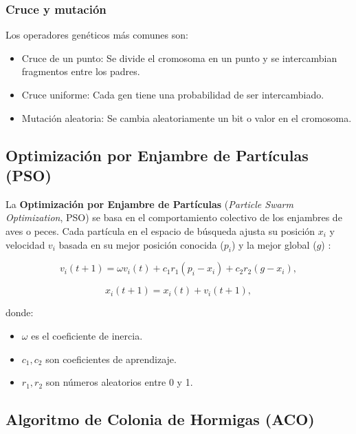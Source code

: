 \begin{itemize}
		\subsubsection{Cruce y mutación}
		
		Los operadores genéticos más comunes son:
		\begin{itemize}
			\item Cruce de un punto: Se divide el cromosoma en un punto y se intercambian fragmentos entre los padres.
			\item Cruce uniforme: Cada gen tiene una probabilidad de ser intercambiado.
			\item Mutación aleatoria: Se cambia aleatoriamente un bit o valor en el cromosoma.
		\end{itemize}
		
		\subsection{Optimización por Enjambre de Partículas (PSO)}
		
		La \textbf{Optimización por Enjambre de Partículas} (\textit{Particle Swarm Optimization}, PSO) se basa en el comportamiento colectivo de los enjambres de aves o peces. Cada partícula en el espacio de búsqueda ajusta su posición \( x_i \) y velocidad \( v_i \) basada en su mejor posición conocida (\( p_i \)) y la mejor global (\( g \)) \cite{kennedy1995particle}:
		
		\begin{equation}
			v_i(t+1) = \omega v_i(t) + c_1 r_1 (p_i - x_i) + c_2 r_2 (g - x_i),
		\end{equation}
		
		\begin{equation}
			x_i(t+1) = x_i(t) + v_i(t+1),
		\end{equation}
		
		donde:
		\begin{itemize}
			\item \( \omega \) es el coeficiente de inercia.
			\item \( c_1, c_2 \) son coeficientes de aprendizaje.
			\item \( r_1, r_2 \) son números aleatorios entre 0 y 1.
		\end{itemize}
		
		\subsection{Algoritmo de Colonia de Hormigas (ACO)}
		

\end{itemize}
